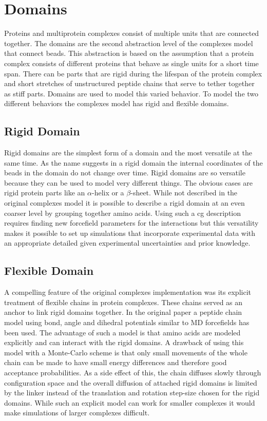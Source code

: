 \documentclass[12pt, twoside]{report}
\begin{document}
\chapter{Domains}
Proteins and multiprotein complexes consist of multiple units that are connected
together. The domains are the second abstraction level of the complexes model
that connect beads. This abstraction is based on the assumption that a protein
complex consists of different proteins that behave as single units for a short
time span. There can be parts that are rigid during the lifespan of the protein
complex and short stretches of unstructured peptide chains that serve to tether
together as stiff parts. Domains are used to model this varied behavior. To
model the two different behaviors the complexes model has rigid and flexible
domains.

\section{Rigid Domain}
Rigid domains are the simplest form of a domain and the most versatile at the
same time. As the name suggests in a rigid domain the internal coordinates of
the beads in the domain do not change over time. Rigid domains are so versatile
because they can be used to model very different things. The obvious cases are
rigid protein parts like an $\alpha$-helix or a $\beta$-sheet. While not
described in the original complexes model it is possible to describe a rigid
domain at an even coarser level by grouping together amino acids. Using such a
\gls{cg} description requires finding new forcefield parameters for the
interactions but this versatility makes it possible to set up simulations that
incorporate experimental data with an appropriate detailed given experimental
uncertainties and prior knowledge.

\section{Flexible Domain}
\label{sec:flexible-domain} A compelling feature of the original complexes
implementation \cite{Kim2008} was its explicit treatment of flexible chains in
protein complexes. These chains served as an anchor to link rigid domains
together. In the original paper \cite{Kim2008} a peptide chain model using bond,
angle and dihedral potentials similar to \gls{MD} forcefields \cite{Hornak2006}
has been used. The advantage of such a model is that amino acids are modeled
explicitly and can interact with the rigid domains. A drawback of using this
model with a Monte-Carlo scheme is that only small movements of the whole chain
can be made to have small energy differences and therefore good acceptance
probabilities. As a side effect of this, the chain diffuses slowly through
configuration space and the overall diffusion of attached rigid domains is
limited by the linker instead of the translation and rotation step-size chosen
for the rigid domains. While such an explicit model can work for smaller
complexes \cite{Rozycki2011} it would make simulations of larger complexes
\cite{Kofinger2015} difficult.
\end{document}
